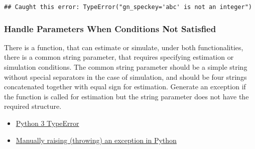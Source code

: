 \documentclass[
]{book}
\providecommand{\tightlist}{%
  \setlength{\itemsep}{0pt}\setlength{\parskip}{0pt}}
\begin{document}
\begin{verbatim}
## Caught this error: TypeError("gn_speckey='abc' is not an integer")
\end{verbatim}

\hypertarget{handle-parameters-when-conditions-not-satisfied}{%
\subsubsection{Handle Parameters When Conditions Not Satisfied}\label{handle-parameters-when-conditions-not-satisfied}}

There is a function, that can estimate or simulate, under both functionalities, there is a common string parameter, that requires specifying estimation or simulation conditions. The common string parameter should be a simple string without special separators in the case of simulation, and should be four strings concatenated together with equal sign for estimation. Generate an exception if the function is called for estimation but the string parameter does not have the required structure.

\begin{itemize}
\tightlist
\item
  \href{https://docs.python.org/3/library/exceptions.html\#TypeError}{Python 3 TypeError}
\item
  \href{https://stackoverflow.com/a/30317038/8280804}{Manually raising (throwing) an exception in Python}
\end{itemize}
\end{document}
